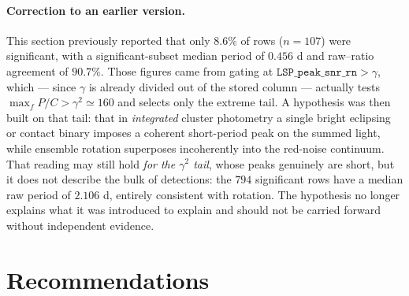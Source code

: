 \documentclass[11pt]{article}
\newcommand{\Srn}{\texttt{LSP\_peak\_snr\_rn}}
\begin{document}
\paragraph{Correction to an earlier version.}
This section previously reported that only $8.6\%$ of rows ($n=107$) were significant,
with a significant-subset median period of $0.456$ d and raw--ratio agreement of
$90.7\%$. Those figures came from gating at $\Srn > \gamma$, which --- since $\gamma$ is
already divided out of the stored column --- actually tests $\max_f P/C > \gamma^2 \simeq
160$ and selects only the extreme tail. A hypothesis was then built on that tail: that in
\emph{integrated} cluster photometry a single bright eclipsing or contact binary imposes a
coherent short-period peak on the summed light, while ensemble rotation superposes
incoherently into the red-noise continuum. That reading may still hold \emph{for the
$\gamma^2$ tail}, whose peaks genuinely are short, but it does not describe the bulk of
detections: the $794$ significant rows have a median raw period of $2.106$ d, entirely
consistent with rotation. The hypothesis no longer explains what it was introduced to
explain and should not be carried forward without independent evidence.

\section{Recommendations}
\end{document}
